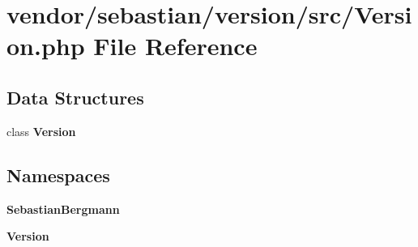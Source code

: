 \section{vendor/sebastian/version/src/\+Version.php File Reference}
\label{sebastian_2version_2src_2_version_8php}
\subsection*{Data Structures}
\begin{DoxyCompactItemize}
\item 
class {\bf Version}
\end{DoxyCompactItemize}
\subsection*{Namespaces}
\begin{DoxyCompactItemize}
\item 
 {\bf Sebastian\+Bergmann}
\item 
 {\bf Version}
\end{DoxyCompactItemize}
